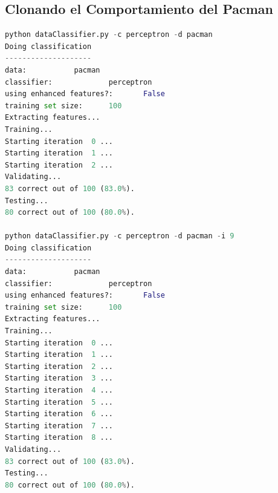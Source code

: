 \documentclass{report}
\begin{document}
      \subsection{Clonando el Comportamiento del Pacman}
        \begin{lstlisting}[language=Python, caption=Ejecución del clonador de comportamiento del pacman]
python dataClassifier.py -c perceptron -d pacman
Doing classification
--------------------
data:           pacman
classifier:             perceptron
using enhanced features?:       False
training set size:      100
Extracting features...
Training...
Starting iteration  0 ...
Starting iteration  1 ...
Starting iteration  2 ...
Validating...
83 correct out of 100 (83.0%).
Testing...
80 correct out of 100 (80.0%).

python dataClassifier.py -c perceptron -d pacman -i 9
Doing classification
--------------------
data:           pacman
classifier:             perceptron
using enhanced features?:       False
training set size:      100
Extracting features...
Training...
Starting iteration  0 ...
Starting iteration  1 ...
Starting iteration  2 ...
Starting iteration  3 ...
Starting iteration  4 ...
Starting iteration  5 ...
Starting iteration  6 ...
Starting iteration  7 ...
Starting iteration  8 ...
Validating...
83 correct out of 100 (83.0%).
Testing...
80 correct out of 100 (80.0%).
        \end{lstlisting}
\end{document}
